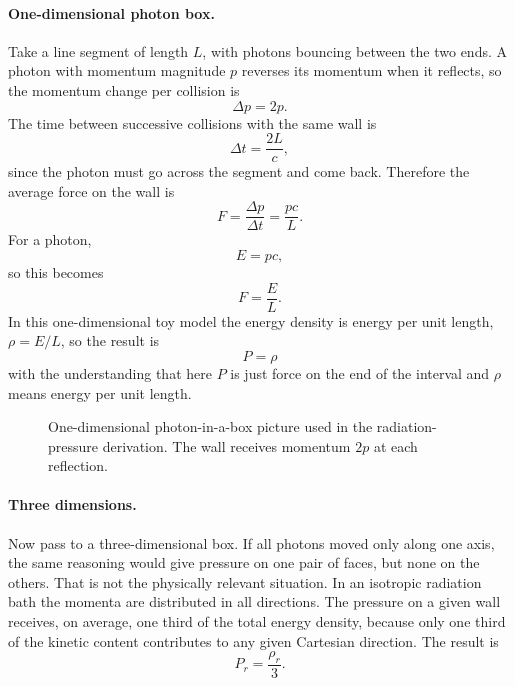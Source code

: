 \paragraph{One-dimensional photon box.}
Take a line segment of length \(L\), with photons bouncing between the two ends. A photon with momentum magnitude \(p\) reverses its momentum when it reflects, so the momentum change per collision is
\begin{equation}
\Delta p = 2p .
\end{equation}
The time between successive collisions with the same wall is
\begin{equation}
\Delta t = \frac{2L}{c},
\end{equation}
since the photon must go across the segment and come back. Therefore the average force on the wall is
\begin{equation}
F = \frac{\Delta p}{\Delta t} = \frac{pc}{L}.
\end{equation}
For a photon,
\begin{equation}
E = pc,
\end{equation}
so this becomes
\begin{equation}
F = \frac{E}{L}.
\end{equation}
In this one-dimensional toy model the energy density is energy per unit length, \(\rho = E/L\), so the result is
\begin{equation}
P=\rho
\end{equation}
with the understanding that here \(P\) is just force on the end of the interval and \(\rho\) means energy per unit length.

\begin{figure}
\centering
{}
\caption{One-dimensional photon-in-a-box picture used in the radiation-pressure derivation. The wall receives momentum \(2p\) at each reflection.}
\end{figure}

\paragraph{Three dimensions.}
Now pass to a three-dimensional box. If all photons moved only along one axis, the same reasoning would give pressure on one pair of faces, but none on the others. That is not the physically relevant situation. In an isotropic radiation bath the momenta are distributed in all directions. The pressure on a given wall receives, on average, one third of the total energy density, because only one third of the kinetic content contributes to any given Cartesian direction. The result is
\begin{equation}
P_r = \frac{\rho_r}{3}.
\end{equation}


